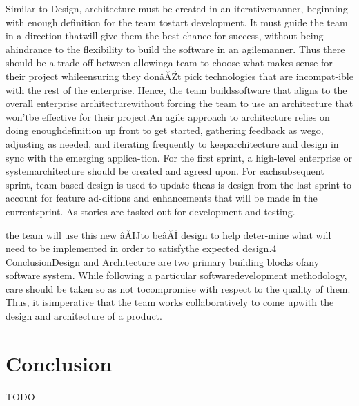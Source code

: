 \documentclass[sigplan,screen]{acmart}
\begin{document}
Similar to Design, architecture must be created in an iterativemanner, beginning with enough definition for the team tostart development. It must guide the team in a direction thatwill give them the best chance for success, without being ahindrance to the flexibility to build the software in an agilemanner. Thus there should be a trade-off between allowinga team to choose what makes sense for their project whileensuring they donâĂŹt pick technologies that are incompat-ible with the rest of the enterprise. Hence, the team buildssoftware that aligns to the overall enterprise architecturewithout forcing the team to use an architecture that won’tbe effective for their project.An agile approach to architecture relies on doing enoughdefinition up front to get started, gathering feedback as wego, adjusting as needed, and iterating frequently to keeparchitecture and design in sync with the emerging applica-tion. For the first sprint, a high-level enterprise or systemarchitecture should be created and agreed upon. For eachsubsequent sprint, team-based design is used to update theas-is design from the last sprint to account for feature ad-ditions and enhancements that will be made in the currentsprint. As stories are tasked out for development and testing.

the team will use this new âĂIJto beâĂİ design to help deter-mine what will need to be implemented in order to satisfythe expected design.4  ConclusionDesign and Architecture are two primary building blocks ofany software system. While following a particular softwaredevelopment methodology, care should be taken so as not tocompromise with respect to the quality of them. Thus, it isimperative that the team works collaboratively to come upwith the design and architecture of a product.

\section{Conclusion}
TODO



\end{document}
